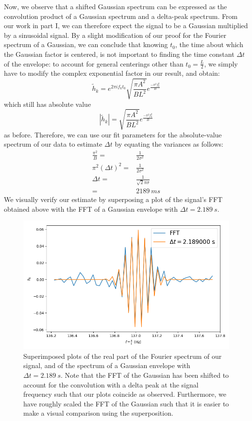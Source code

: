 \documentclass[11pt]{article}
\begin{document}
\begin{enumerate}
	\newpage
	Now, we observe that a shifted Gaussian spectrum can be expressed as the convolution product of a Gaussian spectrum and a delta-peak spectrum. From our work in part I, we can therefore expect the signal to be a Gaussian multiplied by a sinusoidal signal. By a slight modification of our proof for the Fourier spectrum of a Gaussian, we can conclude that knowing $t_0$, the time about which the Gaussian factor is centered, is not important to finding the time constant $\Delta t$ of the envelope: to account for general centerings other than $t_0 = \frac{L}{2}$, we simply have to modify the complex exponential factor in our result, and obtain:
	\[
	\tilde h_k = e^{2 \pi i f_k t_0}\sqrt{\frac{\pi A^2}{B L^2}} e^{\frac{-\pi^2 f_k^2}{B}}
	\]
	which still has absolute value
	\[
	|\tilde h_k| = \sqrt{\frac{\pi A^2}{B L^2}} e^{\frac{-\pi^2 f_k^2}{B}}
	\]
	as before. Therefore, we can use our fit parameters for the absolute-value spectrum of our data to estimate $\Delta t$ by equating the variances as follows:
	\begin{align}
		\frac{\pi^2}{B} =& \frac{1}{2 \sigma^2} \\
		\pi^2 (\Delta t)^2 =& \frac{1}{2 \sigma^2} \\
		\Delta t =& \frac{1}{\sqrt{2} \pi \sigma} \\
		=& 2189 \ ms
	\end{align}
	We visually verify our estimate by superposing a plot of the signal's FFT obtained above with the FFT of a Gaussian envelope with $\Delta t = 2.189 \ s$.
	\begin{figure}[htp]
	\centering
	\includegraphics[scale=0.70]{dt_compare.png}
	\caption{Superimposed plots of the real part of the Fourier spectrum of our signal, and of the spectrum of a Gaussian envelope with $\Delta t = 2.189 \ s$. Note that the FFT of the Gaussian has been shifted to account for the convolution with a delta peak at the signal frequency such that our plots coincide as observed. Furthermore, we have roughly scaled the FFT of the Gaussian such that it is easier to make a visual comparison using the superposition.}
	\label{comp_1}
	\end{figure}
	\newpage
	

\end{enumerate}
\end{document}
